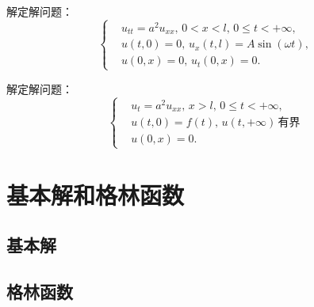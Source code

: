 \begin{problembox}
    \begin{exercise}
        解定解问题：
        \begin{equation*}
            \left\{
                \begin{aligned}
                    &u_{tt} = a^2 u_{xx},\, 0 < x < l,\, 0 \leq t < +\infty,\\
                    &u\left(t, 0\right) = 0,\, u_x\left(t, l\right) = A \sin\left(\omega t\right),\\
                    &u\left(0, x\right) = 0,\, u_t\left(0, x\right) = 0.
                \end{aligned}
            \right.
        \end{equation*}
    \end{exercise}
    \begin{exercise}
        解定解问题：
        \begin{equation*}
            \left\{
                \begin{aligned}
                    &u_{t} = a^2 u_{xx},\, x > l,\, 0 \leq t < +\infty,\\
                    &u\left(t, 0\right) = f\left(t\right),\, u\left(t, +\infty\right)\,\text{有界}\\
                    &u\left(0, x\right) = 0.
                \end{aligned}
            \right.
        \end{equation*}
    \end{exercise}
\end{problembox}

\section{基本解和格林函数}
\subsection{基本解}
\subsection{格林函数}